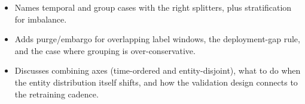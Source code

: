 \begin{interviewq}

\goodgreat
\begin{itemize}
    \item {} Names temporal and group cases with the right splitters, plus stratification for imbalance.
    \item {} Adds purge/embargo for overlapping label windows, the deployment-gap rule, and the case where grouping is over-conservative.
    \item {} Discusses combining axes (time-ordered and entity-disjoint), what to do when the entity distribution itself shifts, and how the validation design connects to the retraining cadence.
\end{itemize}

\end{interviewq}

